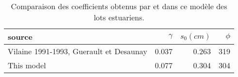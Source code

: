 \begin{table}[htbp]
\centering
\caption{Comparaison des coefficients obtenus par \citet{desaunay_seasonal_1997} et dans ce modèle des lots estuariens.} 
\label{resumé_cyclique}
\begin{tabularx}{0.6\textwidth}{lrrr}
  \hline
source & $\gamma$ & $s_0(cm)$ & $\phi$ \\ 
  \hline
Vilaine 1991-1993, Guerault et Desaunay & 0.037 & 0.263 & 319 \\ 
  This model & 0.077 & 0.304 & 304 \\ 
   \hline
\end{tabularx}
\end{table}
